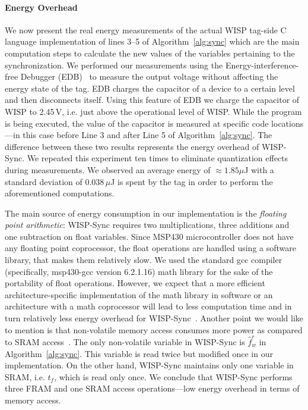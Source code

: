 \documentclass[journal,draftcls,onecolumn,12pt,twoside]{IEEEtranTCOM}
\begin{document}
\paragraph{Energy Overhead}
%
We now present the real energy measurements of the actual WISP tag-side C language implementation of lines 3--5 of Algorithm~\ref{alg:sync} which are the main computation steps to calculate the new values of the variables pertaining to the synchronization. We performed our measurements using the Energy-interference-free Debugger (EDB)~\cite{colin2016energy} to measure the output voltage without affecting the energy state of the tag. EDB charges the capacitor of a device to a certain level and then disconnects itself. Using this feature of EDB we charge the capacitor of WISP to 2.45\,V, i.e. just above the operational level of WISP. While the program is being executed, the value of the capacitor is measured at specific code locations---in this case before Line 3 and after Line 5 of Algorithm~\ref{alg:sync}. The difference between these two results represents the energy overhead of WISP-Sync. We repeated this experiment ten times to eliminate quantization effects during measurements. We observed an average energy of $\approx1.85 \mu$J with a standard deviation of 0.038\,$\mu$J is spent by the tag in order to perform the aforementioned computations.

The main source of energy consumption in our implementation is the \emph{floating point arithmetic}: WISP-Sync requires two multiplications, three additions and one subtraction on float variables. Since MSP430 microcontroller does not have any floating point coprocessor, the float operations are handled using a software library, that makes them relatively slow. We used the standard gcc compiler (specifically, msp430-gcc version 6.2.1.16) math library for the sake of the portability of float operations. However, we expect that a more efficient architecture-specific implementation of the math library in software or an architecture with a math coprocessor will lead to less computation time and in turn relatively less energy overhead for WISP-Sync~\cite{mathlib_website}. Another point we would like to mention is that non-volatile memory access consumes more power as compared to SRAM access~\cite[Section 3.3]{ti_fram}. The only non-volatile variable in WISP-Sync is $\hat{f}_w^r$ in Algorithm~\ref{alg:sync}. This variable is read twice but modified once in our implementation. On the other hand, WISP-Sync maintains only one variable in SRAM, i.e. $t_f$, which is read only once. We conclude that WISP-Sync performs three FRAM and one SRAM access operations---low energy overhead in terms of memory access.
\end{document}
